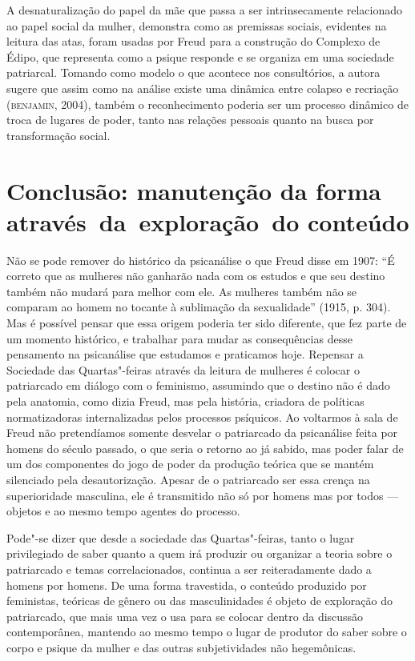 A desnaturalização do papel da mãe que passa a ser intrinsecamente
relacionado ao papel social da mulher, demonstra como as premissas
sociais, evidentes na leitura das atas, foram usadas por Freud para a
construção do Complexo de Édipo, que representa como a psique responde e
se organiza em uma sociedade patriarcal. Tomando como modelo o que
acontece nos consultórios, a autora sugere que assim como na análise
existe uma dinâmica entre colapso e recriação (\textsc{benjamin}, 2004), também o
reconhecimento poderia ser um processo dinâmico de troca de lugares de
poder, tanto nas relações pessoais quanto na busca por transformação
social.

\section{Conclusão: manutenção da forma através~da~exploração~do
conteúdo}

Não se pode remover do histórico da psicanálise o que Freud disse em
1907: ``É correto que as mulheres não ganharão nada com os estudos e que
seu destino também não mudará para melhor com ele. As mulheres também
não se comparam ao homem no tocante à sublimação da sexualidade''
(1915, p. 304). Mas é possível pensar que essa origem poderia ter sido
diferente, que fez parte de um momento histórico, e trabalhar para mudar
as consequências desse pensamento na psicanálise que estudamos e
praticamos hoje. Repensar a Sociedade das Quartas"-feiras através da
leitura de mulheres é colocar o patriarcado em diálogo com o feminismo,
assumindo que o destino não é dado pela anatomia, como dizia Freud, mas
pela história, criadora de políticas normatizadoras internalizadas pelos
processos psíquicos. Ao voltarmos à sala de Freud não pretendíamos
somente desvelar o patriarcado da psicanálise feita por homens do século
passado, o que seria o retorno ao já sabido, mas poder falar de um dos
componentes do jogo de poder da produção teórica que se mantém
silenciado pela desautorização. Apesar de o patriarcado ser essa crença
na superioridade masculina, ele é transmitido não só por homens mas por
todos --- objetos e ao mesmo tempo agentes do processo.

Pode"-se dizer que desde a sociedade das Quartas"-feiras, tanto o lugar
privilegiado de saber quanto a quem irá produzir ou organizar a teoria
sobre o patriarcado e temas correlacionados, continua a ser
reiteradamente dado a homens por homens. De uma forma travestida, o
conteúdo produzido por feministas, teóricas de gênero ou das
masculinidades é objeto de exploração do patriarcado, que mais uma vez o
usa para se colocar dentro da discussão contemporânea, mantendo ao mesmo
tempo o lugar de produtor do saber sobre o corpo e psique da mulher e
das outras subjetividades não hegemônicas.

